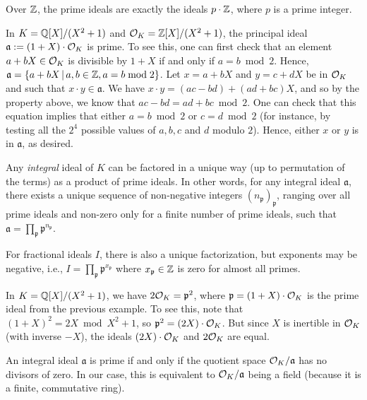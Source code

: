 \begin{example}
Over $\mathbb{Z}$, the prime ideals are exactly the ideals $p \cdot \mathbb{Z}$, where $p$ is a prime integer.

In $K = \mathbb{Q}[X]/(X^2+1)$ and $\mathcal{O}_K = \mathbb{Z}[X]/(X^2+1)$, the principal ideal $\mathfrak{a} := (1+X) \cdot \mathcal{O}_K$ is prime. To see this, one can first check that an element $a + bX \in \mathcal{O}_K$ is divisible by $1+X$ if and only if $a = b \bmod 2$. Hence, $\mathfrak{a} = \{a + bX \,|\, a, b \in \mathbb{Z}, a = b \bmod 2\}$. Let $x = a+bX$ and $y = c+dX$ be in $\mathcal{O}_K$ and such that $x \cdot y \in \mathfrak{a}$. We have $x \cdot y = (ac-bd) + (ad+bc)X$, and so by the property above, we know that $ac-bd = ad+bc \bmod 2$. One can check that this equation implies that either $a = b \bmod 2$ or $c = d \bmod 2$ (for instance, by testing all the $2^4$ possible values of $a,b,c$ and $d$ modulo $2$). Hence, either $x$ or $y$ is in $\mathfrak{a}$, as desired.
\end{example}

\begin{lemma}
Any \emph{integral} ideal of $K$ can be factored in a unique way (up to permutation of the terms) as a product of prime ideals. In other words, for any integral ideal $\mathfrak{a}$, there exists a unique sequence of non-negative integers $(n_\mathfrak{p})_{\mathfrak{p}}$, ranging over all prime ideals and non-zero only for a finite number of prime ideals, such that $\mathfrak{a} = \prod_{\mathfrak{p}} \mathfrak{p}^{n_\mathfrak{p}}$.

\noindent For fractional ideals $I$, there is also a unique factorization, but exponents may be negative, i.e., $I = \prod_{\mathfrak{p}} \mathfrak{p}^{x_\mathfrak{p}}$ where $x_\mathfrak{p} \in \mathbb{Z}$ is zero for almost all primes.
\end{lemma}

\begin{example}
In $K = \mathbb{Q}[X]/(X^2+1)$, we have $2 \mathcal{O}_K = \mathfrak{p}^2$, where $\mathfrak{p} = (1+X) \cdot \mathcal{O}_K$ is the prime ideal from the previous example. To see this, note that $(1+X)^2 = 2X \bmod X^2+1$, so $\mathfrak{p}^2 = (2X) \cdot \mathcal{O}_K$. But since $X$ is inertible in $\mathcal{O}_K$ (with inverse $-X$), the ideals $(2X) \cdot \mathcal{O}_K$ and $2 \mathcal{O}_K$ are equal.
\end{example}

\begin{lemma}
An integral ideal $\mathfrak{a}$ is prime if and only if the quotient space $\mathcal{O}_K/\mathfrak{a}$ has no divisors of zero. In our case, this is equivalent to $\mathcal{O}_K/\mathfrak{a}$ being a field (because it is a finite, commutative ring).
\end{lemma}

